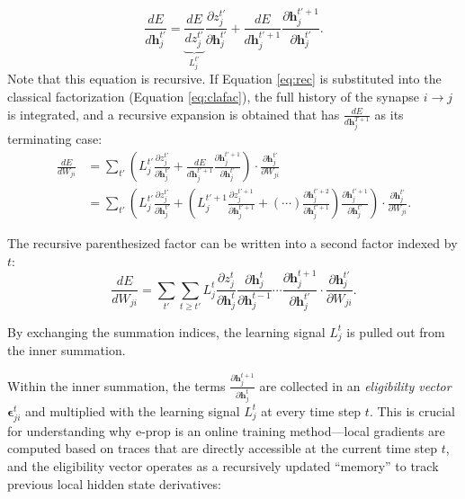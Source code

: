         \begin{equation}\label{eq:rec}
        \frac{dE}{d\mathbf{h}_j^{t'}} = \underbrace{\frac{dE}{dz_j^{t'}}}_{L^{t'}_j} \frac{\partial z_j^{t'}}{\partial\mathbf{h}_j^{t'}} + \frac{dE}{d\mathbf{h}_j^{t'+1}}\frac{\partial\mathbf{h}_j^{t'+1}}{\partial\mathbf{h}_j^{t'}}.
        \end{equation}
        Note that this equation is recursive.
        If Equation \ref{eq:rec} is substituted into the classical factorization (Equation \ref{eq:clafac}), the full history of the synapse $i\rightarrow j$ is integrated, and a recursive expansion is obtained that has $\frac{dE}{d\mathbf{h}^{T+1}_j}$ as its terminating case:
        \begin{align}
        \frac{dE}{dW_{ji}} &= \sum_{t'}\left(L_j^{t'}\frac{\partial z_j^{t'}}{\partial\mathbf{h}_j^{t'}} + \frac{dE}{d\mathbf{h}_j^{t'+1}}\frac{\partial\mathbf{h}_j^{t'+1}}{\partial\mathbf{h}_j^{t'}}\right)\cdot\frac{\partial\mathbf{h}_j^{t'}}{\partial W_{ji}}\\
        &= \sum_{t'}\left(L_j^{t'}\frac{\partial z_j^{t'}}{\partial\mathbf{h}_j^{t'}} + \left( L^{t'+1}_j \frac{\partial z_j^{t'+1}}{\partial\mathbf{h}_j^{t'+1}} + (\cdots)\frac{\partial\mathbf{h}_j^{t'+2}}{\partial\mathbf{h}_j^{t'+1}}  \right) \frac{\partial\mathbf{h}_j^{t'+1}}{\partial\mathbf{h}_j^{t'}}\right)\cdot\frac{\partial\mathbf{h}_j^{t'}}{\partial W_{ji}}.
        \end{align}

        The recursive parenthesized factor can be written into a second factor indexed by $t$:
        \begin{equation}
        \frac{dE}{dW_{ji}} = \sum_{t'}\sum_{t\geq t'}L^t_j\frac{\partial z_j^t}{\partial\mathbf{h}_j^t}\frac{\partial\mathbf{h}^t_j}{\partial\mathbf{h}_j^{t-1}} \cdots \frac{\partial\mathbf{h}_j^{t+1}}{\partial\mathbf{h}_j^{t'}}\cdot\frac{\partial\mathbf{h}_j^{t'}}{\partial W_{ji}}.
        \end{equation}

        By exchanging the summation indices, the learning signal $L_j^t$ is pulled out from the inner summation.

        Within the inner summation, the terms $\frac{\partial\mathbf{h}_j^{t+1}}{\partial\mathbf{h}_j^t}$ are collected in an \emph{eligibility vector} $\bm{\epsilon}^t_{ji}$ and multiplied with the learning signal $L^t_j$ at every time step $t$.
        This is crucial for understanding why e-prop is an online training method---local gradients are computed based on traces that are directly accessible at the current time step $t$, and the eligibility vector operates as a recursively updated ``memory'' to track previous local hidden state derivatives:

